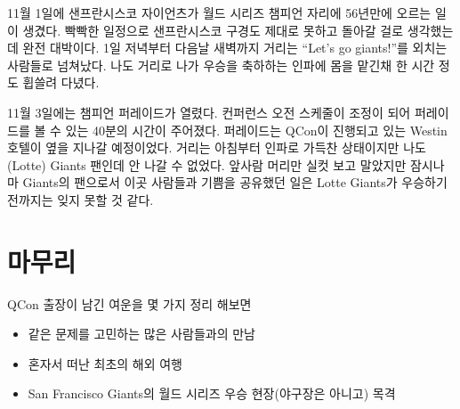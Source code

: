 \documentclass[11pt]{article}
\begin{document}
11월 1일에 샌프란시스코 자이언츠가 월드 시리즈 챔피언 자리에
56년만에 오르는 일이 생겼다. 빡빡한 일정으로 샌프란시스코 구경도 제대로
못하고 돌아갈 걸로 생각했는데 완전 대박이다. 1일 저녁부터 다음날 새벽까지 
거리는 ``Let's go giants!''를 외치는 사람들로 넘쳐났다. 나도 거리로 나가
우승을 축하하는 인파에 몸을 맡긴채 한 시간 정도 휩쓸려 다녔다. 

11월 3일에는 챔피언 퍼레이드가 열렸다. 컨퍼런스 오전 스케줄이 조정이 
되어 퍼레이드를 볼 수 있는 40분의 시간이 주어졌다.  
퍼레이드는 QCon이 진행되고 있는 Westin호텔이 옆을 지나갈 예정이었다.
거리는 아침부터 인파로 가득찬 상태이지만 나도 (Lotte) Giants 팬인데 안
나갈 수 없었다.
앞사람 머리만 실컷 보고 말았지만 잠시나마 Giants의 팬으로서 이곳
사람들과 기쁨을 공유했던 일은 Lotte Giants가 우승하기 전까지는 잊지
못할 것 같다.

\section{마무리}

QCon 출장이 남긴 여운을 몇 가지 정리 해보면
\begin{itemize}
\item 같은 문제를 고민하는 많은 사람들과의 만남
\item 혼자서 떠난 최초의 해외 여행
\item San Francisco Giants의 월드 시리즈 우승 현장(야구장은 아니고) 목격
\end{itemize}

% 

\pagebreak



\end{document}

